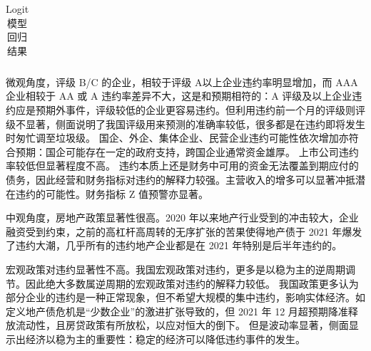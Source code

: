 \begin{center}
\begin{longtable}{p{0.18\linewidth}p{0.1\linewidth}p{0.1\linewidth}p{0.1\linewidth}p{0.1\linewidth}p{0.12\linewidth}p{0.1\linewidth}}
		\caption{Logit 模型回归结果}
		\label{tab:logitresult}
	\end{longtable}
\end{center}

微观角度，评级 B/C 的企业，相较于评级 A以上企业违约率明显增加，而 AAA 企业相较于 AA 或 A 违约率差异不大，这是和预期相符的：A 评级及以上企业违约应是预期外事件，评级较低的企业更容易违约。但利用违约前一个月的评级则评级不显著，侧面说明了我国评级用来预测的准确率较低，很多都是在违约即将发生时匆忙调至垃圾级。
国企、外企、集体企业、民营企业违约可能性依次增加亦符合预期：国企可能存在一定的政府支持\autocite{mo2021china}，跨国企业通常资金雄厚。
上市公司违约率较低但显著程度不高。
违约本质上还是财务中可用的资金无法覆盖到期应付的债务，因此经营和财务指标对违约的解释力较强。主营收入的增多可以显著冲抵潜在违约的可能性。财务指标 Z 值预警亦显著。

中观角度，房地产政策显著性很高。2020 年以来地产行业受到的冲击较大，企业融资受到约束，之前的高杠杆高周转的无序扩张的苦果使得地产债于 2021 年爆发了违约大潮，几乎所有的违约地产企业都是在 2021 年特别是后半年违约的。

宏观政策对违约显著性不高。我国宏观政策对违约，更多是以稳为主的逆周期调节。因此绝大多数属逆周期的宏观政策对违约的解释力较低。
我国政策更多认为部分企业的违约是一种正常现象，但不希望大规模的集中违约，影响实体经济。如定义地产债危机是“少数企业”的激进扩张导致的，但 2021 年 12 月超预期降准释放流动性，且房贷政策有所放松，以应对恒大的倒下。
但是波动率显著，侧面显示出经济以稳为主的重要性：稳定的经济可以降低违约事件的发生。

